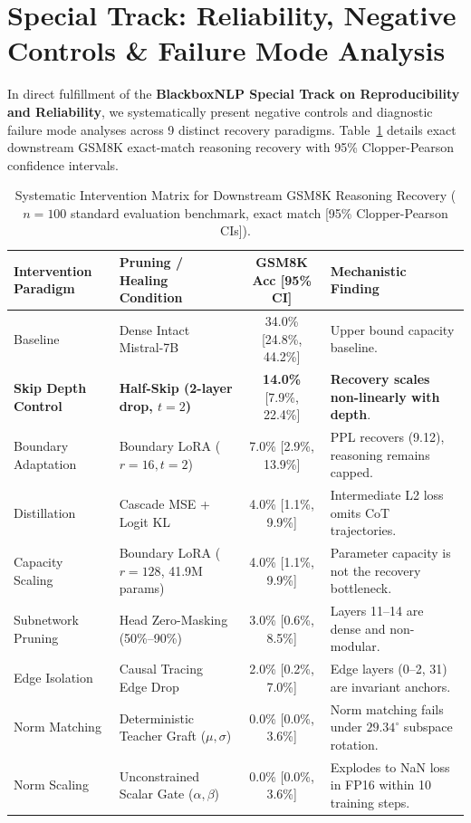 \documentclass[11pt]{article}
\begin{document}
\section{Special Track: Reliability, Negative Controls \& Failure Mode Analysis}

In direct fulfillment of the \textbf{BlackboxNLP Special Track on Reproducibility and Reliability}, we systematically present negative controls and diagnostic failure mode analyses across 9 distinct recovery paradigms. Table~\ref{tab:ablation_matrix} details exact downstream GSM8K exact-match reasoning recovery with 95\% Clopper-Pearson confidence intervals.

\begin{table}[t!]
\centering
\small
\setlength{\tabcolsep}{3.5pt}
\caption{Systematic Intervention Matrix for Downstream GSM8K Reasoning Recovery ($n=100$ standard evaluation benchmark, exact match [95\% Clopper-Pearson CIs]).}
\label{tab:ablation_matrix}
\begin{tabular}{llcp{5.5cm}}
\toprule
\textbf{Intervention Paradigm} & \textbf{Pruning / Healing Condition} & \textbf{GSM8K Acc [95\% CI]} & \textbf{Mechanistic Finding} \\
\midrule
Baseline & Dense Intact Mistral-7B & 34.0\% [24.8\%, 44.2\%] & Upper bound capacity baseline. \\
\textbf{Skip Depth Control} & \textbf{Half-Skip (2-layer drop, $t=2$)} & \textbf{14.0\%} [7.9\%, 22.4\%] & \textbf{Recovery scales non-linearly with depth}. \\
Boundary Adaptation & Boundary LoRA ($r=16, t=2$) & 7.0\% [2.9\%, 13.9\%] & PPL recovers (9.12), reasoning remains capped. \\
Distillation & Cascade MSE + Logit KL & 4.0\% [1.1\%, 9.9\%] & Intermediate L2 loss omits CoT trajectories. \\
Capacity Scaling & Boundary LoRA ($r=128$, 41.9M params) & 4.0\% [1.1\%, 9.9\%] & Parameter capacity is not the recovery bottleneck. \\
Subnetwork Pruning & Head Zero-Masking (50\%--90\%) & 3.0\% [0.6\%, 8.5\%] & Layers 11--14 are dense and non-modular. \\
Edge Isolation & Causal Tracing Edge Drop & 2.0\% [0.2\%, 7.0\%] & Edge layers (0--2, 31) are invariant anchors. \\
Norm Matching & Deterministic Teacher Graft ($\mu, \sigma$) & 0.0\% [0.0\%, 3.6\%] & Norm matching fails under $29.34^\circ$ subspace rotation. \\
Norm Scaling & Unconstrained Scalar Gate ($\alpha, \beta$) & 0.0\% [0.0\%, 3.6\%] & Explodes to NaN loss in FP16 within 10 training steps. \\
\bottomrule
\end{tabular}
\end{table}
\end{document}
